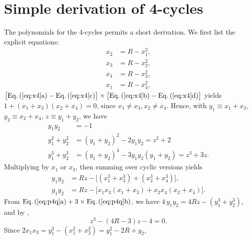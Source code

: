 \documentclass[twocolumn]{revtex4-1}
\begin{document}
\appendix



\section{\label{apd:per4}Simple derivation of 4-cycles}



The polynomials for the 4-cycles permits a short derivation.
We first list the explicit equations:
%
%
%
\begin{subequations}
\label{eq:x4}
\begin{align}
  x_2 &= R - x_1^2, \\
  x_3 &= R - x_2^2, \\
  x_4 &= R - x_3^2, \\
  x_1 &= R - x_4^2,
\end{align}
\end{subequations}
%
$\big[\mathrm{\refeqsub{x4}{a}} - \mathrm{\refeqsub{x4}{c}}\big]
\times
\big[\mathrm{\refeqsub{x4}{b}} - \mathrm{\refeqsub{x4}{d}}\big]$
yields $1 + (x_1 + x_3) (x_2 + x_4) = 0$,
since $x_1 \ne x_3, x_2 \ne x_4$.
%
Hence, with
$y_1 \equiv x_1 + x_3$, $y_2 \equiv x_2 + x_4$,
$z \equiv y_1 + y_2$,
we have
%
%
%
\begin{subequations}
\begin{align}
y_1 y_2       &= -1 \\
y_1^2 + y_2^2 & = (y_1 + y_2)^2 - 2 y_1 y_2 = z^2 + 2 \\
y_1^3 + y_2^3 & = (y_1 + y_2)^3 - 3 y_1 y_2 (y_1 + y_2) = z^3 + 3 z.
\end{align}
\label{eq:ypow4}
\end{subequations}
%
%
Multiplying  by $x_1$ or $x_3$,
then summing over cyclic versions yields
\begin{subequations}
\begin{align}
y_1 y_2 &= R z - \big[(x_1^3 + x_3^3) + (x_2^3 + x_4^3)\big],\\
y_1 y_2 &= R z - \big[x_1 x_3 (x_1 + x_3) + x_2 x_4 (x_2 + x_4)\big].
\end{align}
\label{eq:p4q}
\end{subequations}
%
From
$\mathrm{\refeqsub{p4q}{a}} + 3 \times \mathrm{\refeqsub{p4q}{b}}$,
we have
$4 \, y_1 y_2 = 4 R z - (y_1^3 + y_2^3)$,
%
and by ,
\begin{equation}
  z^3 - (4 R - 3) z - 4 = 0.
  \label{eq:xr4s}
\end{equation}
%
%
Since $2 x_1 x_3 = y_1^2 - (x_1^2 + x_3^2) = y_1^2 - 2 R + y_2$,
\end{document}
